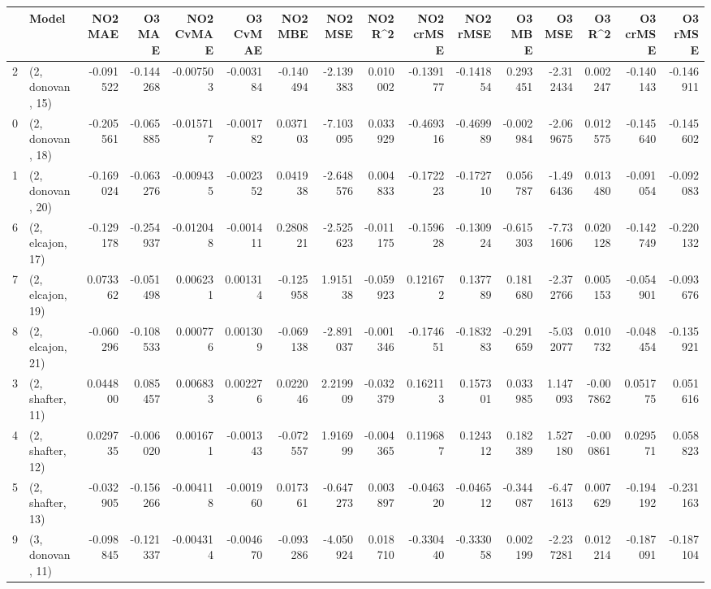 \begin{tabular}{llrrrrrrrrrrrrrr}
\toprule
{} &             Model &   NO2 MAE &    O3 MAE &  NO2 CvMAE &  O3 CvMAE &   NO2 MBE &    NO2 MSE &   NO2 R\textasciicircum2 &  NO2 crMSE &  NO2 rMSE &    O3 MBE &      O3 MSE &    O3 R\textasciicircum2 &  O3 crMSE &   O3 rMSE \\
\midrule
2  &  (2, donovan, 15) & -0.091522 & -0.144268 &  -0.007503 & -0.003184 & -0.140494 &  -2.139383 &  0.010002 &  -0.139177 & -0.141854 &  0.293451 &   -2.312434 &  0.002247 & -0.140143 & -0.146911 \\
0  &  (2, donovan, 18) & -0.205561 & -0.065885 &  -0.015717 & -0.001782 &  0.037103 &  -7.103095 &  0.033929 &  -0.469316 & -0.469989 & -0.002984 &   -2.069675 &  0.012575 & -0.145640 & -0.145602 \\
1  &  (2, donovan, 20) & -0.169024 & -0.063276 &  -0.009435 & -0.002352 &  0.041938 &  -2.648576 &  0.004833 &  -0.172223 & -0.172710 &  0.056787 &   -1.496436 &  0.013480 & -0.091054 & -0.092083 \\
6  &  (2, elcajon, 17) & -0.129178 & -0.254937 &  -0.012048 & -0.001411 &  0.280821 &  -2.525623 & -0.011175 &  -0.159628 & -0.130924 & -0.615303 &   -7.731606 &  0.020128 & -0.142749 & -0.220132 \\
7  &  (2, elcajon, 19) &  0.073362 & -0.051498 &   0.006231 &  0.001314 & -0.125958 &   1.915138 & -0.059923 &   0.121672 &  0.137789 &  0.181680 &   -2.372766 &  0.005153 & -0.054901 & -0.093676 \\
8  &  (2, elcajon, 21) & -0.060296 & -0.108533 &   0.000776 &  0.001309 & -0.069138 &  -2.891037 & -0.001346 &  -0.174651 & -0.183283 & -0.291659 &   -5.032077 &  0.010732 & -0.048454 & -0.135921 \\
3  &  (2, shafter, 11) &  0.044800 &  0.085457 &   0.006833 &  0.002276 &  0.022046 &   2.219909 & -0.032379 &   0.162113 &  0.157301 &  0.033985 &    1.147093 & -0.007862 &  0.051775 &  0.051616 \\
4  &  (2, shafter, 12) &  0.029735 & -0.006020 &   0.001671 & -0.001343 & -0.072557 &   1.916999 & -0.004365 &   0.119687 &  0.124312 &  0.182389 &    1.527180 & -0.000861 &  0.029571 &  0.058823 \\
5  &  (2, shafter, 13) & -0.032905 & -0.156266 &  -0.004118 & -0.001960 &  0.017361 &  -0.647273 &  0.003897 &  -0.046320 & -0.046512 & -0.344087 &   -6.471613 &  0.007629 & -0.194192 & -0.231163 \\
9  &  (3, donovan, 11) & -0.098845 & -0.121337 &  -0.004314 & -0.004670 & -0.093286 &  -4.050924 &  0.018710 &  -0.330440 & -0.333058 &  0.002199 &   -2.237281 &  0.012214 & -0.187091 & -0.187104 \\

\end{tabular}
